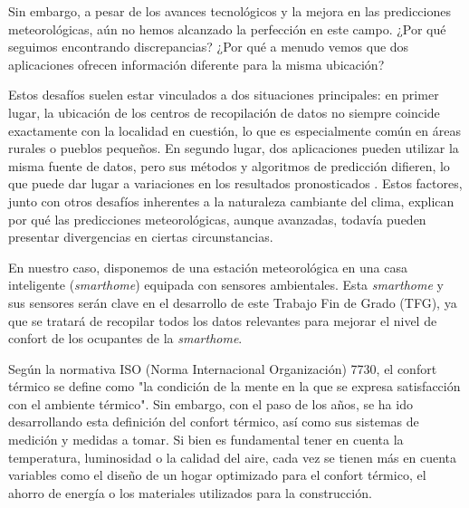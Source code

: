 Sin embargo, a pesar de los avances tecnológicos y la mejora en las predicciones meteorológicas, aún no hemos alcanzado la perfección en este campo. ¿Por qué seguimos encontrando discrepancias? ¿Por qué a menudo vemos que dos aplicaciones ofrecen información diferente para la misma ubicación?

Estos desafíos suelen estar vinculados a dos situaciones principales: en primer lugar, la ubicación de los centros de recopilación de datos no siempre coincide exactamente con la localidad en cuestión, lo que es especialmente común en áreas rurales o pueblos pequeños. En segundo lugar, dos aplicaciones pueden utilizar la misma fuente de datos, pero sus métodos y algoritmos de predicción difieren, lo que puede dar lugar a variaciones en los resultados pronosticados \cite{intro_3}. Estos factores, junto con otros desafíos inherentes a la naturaleza cambiante del clima, explican por qué las predicciones meteorológicas, aunque avanzadas, todavía pueden presentar divergencias en ciertas circunstancias.


En nuestro caso, disponemos de una estación meteorológica en una casa inteligente (\textit{smarthome}) equipada con sensores ambientales. Esta \textit{smarthome} y sus sensores serán clave en el desarrollo de este Trabajo Fin de Grado (TFG), ya que se tratará de recopilar todos los datos relevantes para mejorar el nivel de confort de los ocupantes de la \textit{smarthome}.


Según la normativa ISO (Norma Internacional Organización) 7730, el confort térmico se define como "la condición de la mente en la que se expresa satisfacción con el ambiente térmico". Sin embargo, con el paso de los años, se ha ido desarrollando esta definición del confort térmico, así como sus sistemas de medición y medidas a tomar. Si bien es fundamental tener en cuenta la temperatura, luminosidad o la calidad del aire, cada vez se tienen más en cuenta variables como el diseño de un hogar optimizado para el confort térmico, el ahorro de energía o los materiales utilizados para la construcción.

